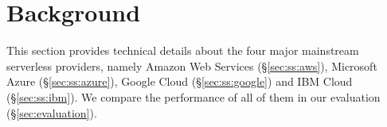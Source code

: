 
\section{Background}
\label{sec:background}

This section provides technical details about the four major mainstream serverless providers, namely Amazon Web Services (\S\ref{sec:ss:aws}), Microsoft Azure (\S\ref{sec:ss:azure}), Google Cloud (\S\ref{sec:ss:google}) and IBM Cloud (\S\ref{sec:ss:ibm}). 
We compare the performance of all of them in our evaluation (\S\ref{sec:evaluation}).


